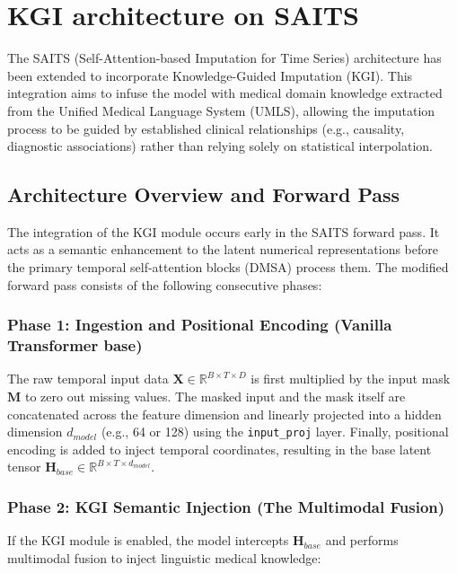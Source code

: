 \section{KGI architecture on SAITS}
The SAITS (Self-Attention-based Imputation for Time Series) architecture has been extended to incorporate Knowledge-Guided Imputation (KGI). This integration aims to infuse the model with medical domain knowledge extracted from the Unified Medical Language System (UMLS), allowing the imputation process to be guided by established clinical relationships (e.g., causality, diagnostic associations) rather than relying solely on statistical interpolation.

\subsection{Architecture Overview and Forward Pass}
The integration of the KGI module occurs early in the SAITS forward pass. It acts as a semantic enhancement to the latent numerical representations before the primary temporal self-attention blocks (DMSA) process them. The modified forward pass consists of the following consecutive phases:

\subsubsection{Phase 1: Ingestion and Positional Encoding (Vanilla Transformer base)}
The raw temporal input data $\mathbf{X} \in \mathbb{R}^{B \times T \times D}$ is first multiplied by the input mask $\mathbf{M}$ to zero out missing values. The masked input and the mask itself are concatenated across the feature dimension and linearly projected into a hidden dimension $d_{model}$ (e.g., 64 or 128) using the \texttt{input\_proj} layer. Finally, positional encoding is added to inject temporal coordinates, resulting in the base latent tensor $\mathbf{H}_{base} \in \mathbb{R}^{B \times T \times d_{model}}$.

\subsubsection{Phase 2: KGI Semantic Injection (The Multimodal Fusion)}
If the KGI module is enabled, the model intercepts $\mathbf{H}_{base}$ and performs multimodal fusion to inject linguistic medical knowledge:

